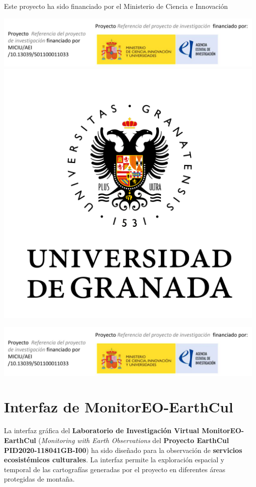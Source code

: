 \documentclass[
]{book}
\begin{document}
Este proyecto ha sido financiado por el Ministerio de Ciencia e Innovación

\includegraphics{assets/logo.jpeg}
\includegraphics{assets/logo-ugr.png}

\includegraphics{assets/logo.jpeg}

\chapter{Interfaz de MonitorEO-EarthCul}\label{interfaz}

La interfaz gráfica del \textbf{Laboratorio de Investigación Virtual MonitorEO-EarthCul} (\emph{Monitoring with Earth Observations} del \textbf{Proyecto EarthCul PID2020-118041GB-I00}) ha sido diseñado para la observación de \textbf{servicios ecosistémicos culturales}. La interfaz permite la exploración espacial y temporal de las cartografías generadas por el proyecto en diferentes áreas protegidas de montaña.
\end{document}
